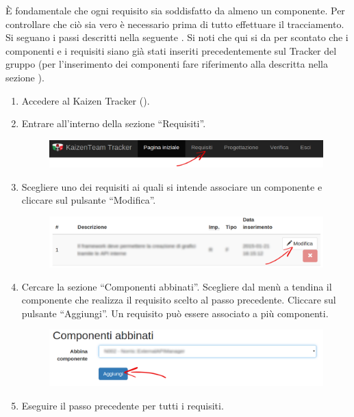 					 \label{sec:ProgTracCompReq}
					È fondamentale che ogni requisito sia soddisfatto da almeno un componente. Per controllare che ciò sia vero è necessario prima di tutto effettuare il tracciamento. Si seguano i passi descritti nella seguente . Si noti che qui si da per scontato che i componenti e i requisiti siano già stati inseriti precedentemente sul Tracker del gruppo (per l'inserimento dei componenti fare riferimento alla  descritta nella sezione ).
					\begin{enumerate}
						\item Accedere al Kaizen  Tracker ().
						\item Entrare all'interno della sezione “Requisiti”.
						\begin{figure}[H]
							\centering
							\includegraphics[width=\textwidth]{Pics/HomePageMenuFrecciaReq}
						\end{figure}
						\item Scegliere uno dei requisiti ai quali si intende associare un componente e cliccare sul pulsante “Modifica”.
						\begin{figure}[H]
							\centering
							\includegraphics[width=\textwidth]{Pics/VistaRequisitoFrecciaModifica}
						\end{figure}
						\item Cercare la sezione “Componenti abbinati”. Scegliere dal menù a tendina il componente che realizza il requisito scelto al passo precedente. Cliccare sul pulsante “Aggiungi”. Un requisito  può essere associato a più componenti.
						\begin{figure}[H]
							\centering
							\includegraphics[width=\textwidth]{Pics/AbbianareComponenteRequisito}
						\end{figure}
						\item Eseguire il passo precedente per tutti i requisiti.
					\end{enumerate}
